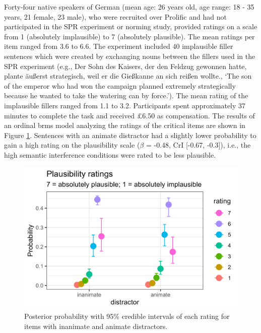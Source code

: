 \documentclass[review,preprint,12pt,authoryear,floatsintext]{elsarticle}
\begin{document}
{Forty-four native speakers of German (mean age: 26 years old, age range: 18 - 35 years, 21 female, 23 male), who were recruited over Prolific and had not participated in the SPR experiment or norming study, provided ratings on a scale from 1 (absolutely implausible) to 7 (absolutely plausible). The mean ratings per item ranged from 3.6 to 6.6. The experiment included 40 implausible filler sentences which were created by exchanging nouns between the fillers used in the SPR experiment (e.g., Der Sohn des Kaisers, der den Feldzug gewonnen hatte, plante äußerst strategisch, weil er die Gießkanne an sich reißen wollte., `The son of the emperor who had won the campaign planned extremely strategically because he wanted to take the watering can by force.').  The mean rating of the implausible fillers ranged from 1.1 to 3.2. Participants spent approximately 37 minutes to complete the task and received \pounds 6.50 as compensation. The results of an ordinal brms model analyzing the ratings of the critical items are shown in Figure \ref{fig:plausibility_anim_inanim}. Sentences with an animate distractor had a slightly lower probability to gain a high rating on the plausibility scale ($\beta$ = -0.48, CrI [-0.67, -0.3]), i.e., the high semantic interference conditions were rated to be less plausible.

\begin{figure}[htpb]
    \centering
        \caption{Posterior probability with 95\% credible intervals of each rating for items with inanimate and animate distractors.}
    \label{fig:plausibility_anim_inanim}
    \includegraphics[width=0.8\linewidth]{plausibility_anim_inan.jpg}
\end{figure}

}
\end{document}
